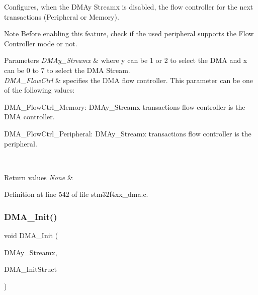 Configures, when the D\+M\+Ay Streamx is disabled, the flow controller for the next transactions (Peripheral or Memory). 

\begin{DoxyNote}{Note}
Before enabling this feature, check if the used peripheral supports the Flow Controller mode or not.
\end{DoxyNote}

\begin{DoxyParams}{Parameters}
{\em D\+M\+Ay\+\_\+\+Streamx} & where y can be 1 or 2 to select the D\+MA and x can be 0 to 7 to select the D\+MA Stream. \\
\hline
{\em D\+M\+A\+\_\+\+Flow\+Ctrl} & specifies the D\+MA flow controller. This parameter can be one of the following values\+: \begin{DoxyItemize}
\item D\+M\+A\+\_\+\+Flow\+Ctrl\+\_\+\+Memory\+: D\+M\+Ay\+\_\+\+Streamx transactions flow controller is the D\+MA controller. \item D\+M\+A\+\_\+\+Flow\+Ctrl\+\_\+\+Peripheral\+: D\+M\+Ay\+\_\+\+Streamx transactions flow controller is the peripheral. \end{DoxyItemize}
\\
\hline
\end{DoxyParams}

\begin{DoxyRetVals}{Return values}
{\em None} & \\
\hline
\end{DoxyRetVals}


Definition at line 542 of file stm32f4xx\+\_\+dma.\+c.

\mbox{\label{group___d_m_a___group1_gaced8a4149acfb0a50b50e63273a87148}} 
\subsubsection{\texorpdfstring{D\+M\+A\+\_\+\+Init()}{DMA\_Init()}}
{\footnotesize\ttfamily void D\+M\+A\+\_\+\+Init (\begin{DoxyParamCaption}\item[{\hyperlink{struct_d_m_a___stream___type_def}{D\+M\+A\+\_\+\+Stream\+\_\+\+Type\+Def} $\ast$}]{D\+M\+Ay\+\_\+\+Streamx,  }\item[{\hyperlink{struct_d_m_a___init_type_def}{D\+M\+A\+\_\+\+Init\+Type\+Def} $\ast$}]{D\+M\+A\+\_\+\+Init\+Struct }\end{DoxyParamCaption})}



